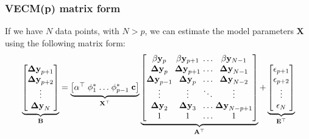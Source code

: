 \documentclass{beamer}
\begin{document}
\begin{frame}
\frametitle{VECM(p) matrix form}
If we have $N$ data points, with $N>p$, we can estimate the model parameters $\mathbf{X}$ using the following matrix form:
\small
\begin{equation*}
\underbrace{
      \begin{bmatrix}
       \mathbf{\Delta y}_{p+1}  \\ 
       \mathbf{\Delta y}_{p+2}  \\ 
       \vdots                   \\ 
       \mathbf{\Delta y}_N      
      \end{bmatrix}}_{\mathbf{B} } =
\arraycolsep=1.4pt  
\underbrace{\begin{bmatrix}
   \alpha^\top & \phi^*_1 & \dots & \phi^*_{p-1} &\mathbf{c}   
  \end{bmatrix}}_{\mathbf{X}^\top}
\underbrace{\begin{bmatrix}
 \beta\mathbf{y}_p      & \beta\mathbf{y}_{p+1}   & \dots&   \beta\mathbf{y}_{N-1}   \\
 \mathbf{\Delta y}_{p}   & \mathbf{\Delta y}_{p+1}& \dots &  \mathbf{\Delta y}_{N-1} \\
 \mathbf{\Delta y}_{p-1} & \mathbf{\Delta y}_{p}  & \dots &  \mathbf{\Delta y}_{N-2}   \\
 \vdots                  & \vdots                 & \ddots&  \vdots                   \\
 \mathbf{\Delta y}_{2}   & \mathbf{\Delta y}_{3} & \dots &   \mathbf{\Delta y}_{N-p+1} \\
 1                      & 1                       & \dots     & 1   
 \end{bmatrix}}_{\mathbf{A}^\top}
+
\underbrace{\begin{bmatrix}
              \mathbf{\epsilon}_{p+1} \\ 
              \mathbf{\epsilon}_{p+2} \\ 
              \vdots \\ 
              \mathbf{\epsilon}_N
             \end{bmatrix}}_{\mathbf{E}^\top}
\end{equation*}
\end{frame}
\end{document}
